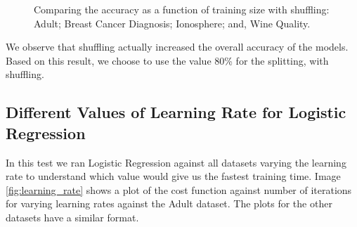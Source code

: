 \documentclass[conference]{IEEEtran}
\begin{document}
\begin{figure}
\hspace{8pt}%
%
\caption[Comparing the accuracy as a function of training size with shuffling]{Comparing the accuracy as a function of training size with shuffling:
 Adult;
 Breast Cancer Diagnosis;
 Ionosphere; and,
 Wine Quality.}%
\label{fig:ex3}%
\end{figure}

We observe that shuffling actually increased the overall accuracy of the models. Based on this result, we choose to use the value 80\% for the splitting, with shuffling.

\subsection{Different Values of Learning Rate for Logistic Regression}

In this test we ran Logistic Regression against all datasets varying the learning rate to understand which value would give us the fastest training time. Image \ref{fig:learning_rate} shows a plot of the cost function against number of iterations for varying learning rates against the Adult dataset. The plots for the other datasets have a similar format.
\end{document}
